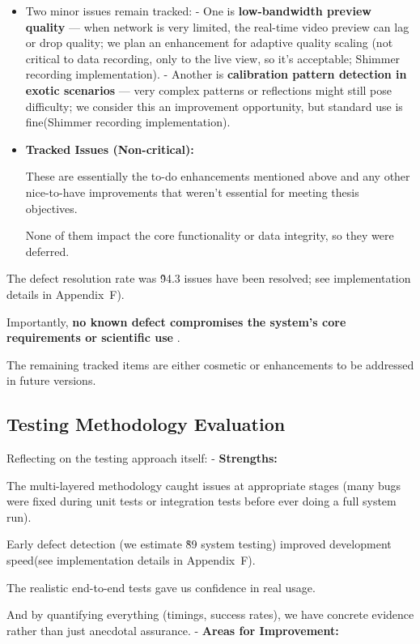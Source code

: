 {{{{{{{\begin{itemize}
\item Two minor issues remain tracked: - One is \textbf{low-bandwidth preview quality}
 --- when network is very limited, the real-time video preview can lag or drop
 quality; we plan an enhancement for adaptive quality scaling (not critical to data
 recording, only to the live view, so it's acceptable; Shimmer recording
 implementation).  - Another is \textbf{calibration pattern detection in exotic
 scenarios}
 --- very complex patterns or reflections might still pose difficulty; we consider
 this an improvement opportunity, but standard use is fine(Shimmer recording
 implementation).

\item \textbf{Tracked Issues (Non-critical):}

These are essentially the to-do enhancements mentioned above and any other
nice-to-have improvements that weren't essential for meeting thesis objectives.

None of them impact the core functionality or data integrity, so they were deferred.

\end{itemize}

The defect resolution rate was \~94.3%
issues have been resolved; see implementation details in Appendix~F).

Importantly, \textbf{no known defect compromises the system's core requirements or
scientific use}
.

The remaining tracked items are either cosmetic or enhancements to be addressed in
future versions.

\subsection{Testing Methodology Evaluation}

Reflecting on the testing approach itself: - \textbf{Strengths:}

The multi-layered methodology caught issues at appropriate stages (many bugs were
fixed during unit tests or integration tests before ever doing a full system run).

Early defect detection (we estimate \~89%
system testing) improved development speed(see implementation details in Appendix~F).

The realistic end-to-end tests gave us confidence in real usage.

And by quantifying everything (timings, success rates), we have concrete evidence
rather than just anecdotal assurance.  - \textbf{Areas for Improvement:}

}}}}}}}
